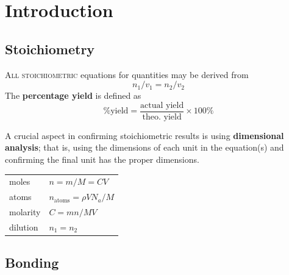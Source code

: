 \documentclass{tufte-book}
\title[Chemistry \& Materials Science]{%
  \setlength{\parindent}{0pt}%
Chemistry \& \par Materials \par Science}
\author{Richard Robinson}
\renewcommand{\emph}[1]{\textbf{#1}}
\begin{document}
\maketitle
\setlength{\parindent}{0pt}


\chapter{Introduction}

\section{Stoichiometry}

\textsc{All stoichiometric} equations for quantities may be derived from \begin{equation}
  n_1/v_1 = n_2/v_2
\end{equation}
The \emph{percentage yield} is defined as \begin{equation}
  \text{\% yield} = \frac{\text{actual yield}}{\text{theo. yield}} \times 100 \%
\end{equation}

A crucial aspect in confirming stoichiometric results is using \emph{dimensional analysis}; that is, using the dimensions of each unit in the equation(s) and confirming the final unit has the proper dimensions.
\begin{center}
  \begin{tabular}{ll}
    moles & $n = m/M = CV$ \\
    atoms & $n_{\mathrm{atoms}} = \rho V N_a / M$ \\
    molarity & $C = mn/MV$ \\
    dilution & $n_1 = n_2$
  \end{tabular}
\end{center}

\section{Bonding}
\end{document}
